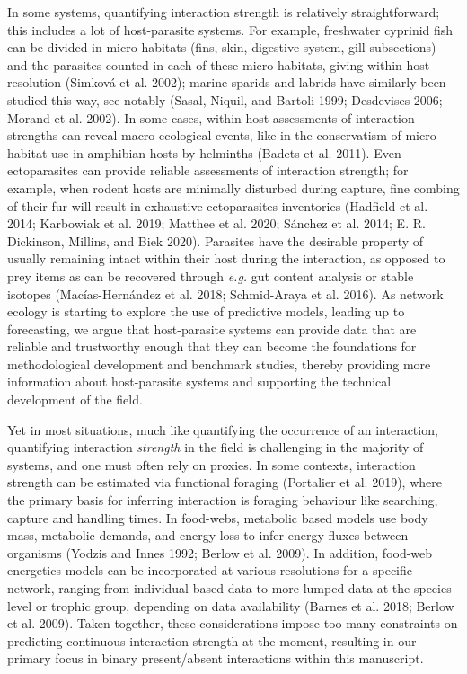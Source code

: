 \documentclass[11pt]{article}
\begin{document}
In some systems, quantifying interaction strength is relatively
straightforward; this includes a lot of host-parasite systems. For
example, freshwater cyprinid fish can be divided in micro-habitats
(fins, skin, digestive system, gill subsections) and the parasites
counted in each of these micro-habitats, giving within-host resolution
(Simková et al. 2002); marine sparids and labrids have similarly been
studied this way, see notably (Sasal, Niquil, and Bartoli 1999;
Desdevises 2006; Morand et al. 2002). In some cases, within-host
assessments of interaction strengths can reveal macro-ecological events,
like in the conservatism of micro-habitat use in amphibian hosts by
helminths (Badets et al. 2011). Even ectoparasites can provide reliable
assessments of interaction strength; for example, when rodent hosts are
minimally disturbed during capture, fine combing of their fur will
result in exhaustive ectoparasites inventories (Hadfield et al. 2014;
Karbowiak et al. 2019; Matthee et al. 2020; Sánchez et al. 2014; E. R.
Dickinson, Millins, and Biek 2020). Parasites have the desirable
property of usually remaining intact within their host during the
interaction, as opposed to prey items as can be recovered through
\emph{e.g.} gut content analysis or stable isotopes (Macías-Hernández et
al. 2018; Schmid-Araya et al. 2016). As network ecology is starting to
explore the use of predictive models, leading up to forecasting, we
argue that host-parasite systems can provide data that are reliable and
trustworthy enough that they can become the foundations for
methodological development and benchmark studies, thereby providing more
information about host-parasite systems and supporting the technical
development of the field.

Yet in most situations, much like quantifying the occurrence of an
interaction, quantifying interaction \emph{strength} in the field is
challenging in the majority of systems, and one must often rely on
proxies. In some contexts, interaction strength can be estimated via
functional foraging (Portalier et al. 2019), where the primary basis for
inferring interaction is foraging behaviour like searching, capture and
handling times. In food-webs, metabolic based models use body mass,
metabolic demands, and energy loss to infer energy fluxes between
organisms (Yodzis and Innes 1992; Berlow et al. 2009). In addition,
food-web energetics models can be incorporated at various resolutions
for a specific network, ranging from individual-based data to more
lumped data at the species level or trophic group, depending on data
availability (Barnes et al. 2018; Berlow et al. 2009). Taken together,
these considerations impose too many constraints on predicting
continuous interaction strength at the moment, resulting in our primary
focus in binary present/absent interactions within this manuscript.
\end{document}
